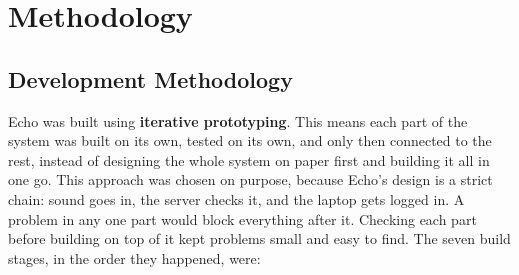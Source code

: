 \chapter{Methodology}
\label{ch:methodology}

\section{Development Methodology}

Echo was built using \textbf{iterative prototyping}. This means each part
of the system was built on its own, tested on its own, and only then
connected to the rest, instead of designing the whole system on paper
first and building it all in one go. This approach was chosen on purpose,
because Echo's design is a strict chain: sound goes in, the server checks
it, and the laptop gets logged in. A problem in any one part would block
everything after it. Checking each part before building on top of it kept
problems small and easy to find. The seven build stages, in the order they
happened, were:

